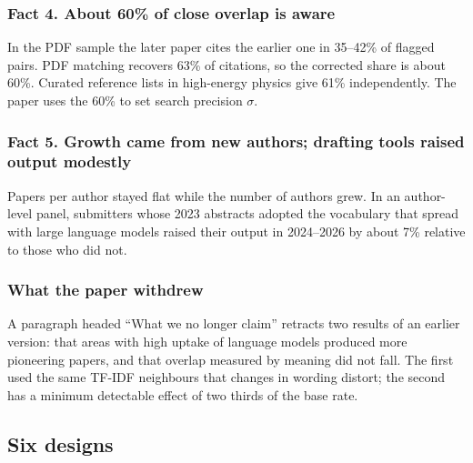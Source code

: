 \subsubsection{Fact 4. About 60\% of close overlap is aware}
In the PDF sample the later paper cites the earlier one in 35--42\% of flagged pairs. PDF matching recovers 63\% of citations, so the corrected share is about 60\%. Curated reference lists in high-energy physics give 61\% independently. The paper uses the 60\% to set search precision $\sigma$.

\subsubsection{Fact 5. Growth came from new authors; drafting tools raised output modestly}
Papers per author stayed flat while the number of authors grew. In an author-level panel, submitters whose 2023 abstracts adopted the vocabulary that spread with large language models raised their output in 2024--2026 by about 7\% relative to those who did not.

\subsubsection{What the paper withdrew}
A paragraph headed ``What we no longer claim'' retracts two results of an earlier version: that areas with high uptake of language models produced more pioneering papers, and that overlap measured by meaning did not fall. The first used the same TF-IDF neighbours that changes in wording distort; the second has a minimum detectable effect of two thirds of the base rate.

\subsection{Six designs}


